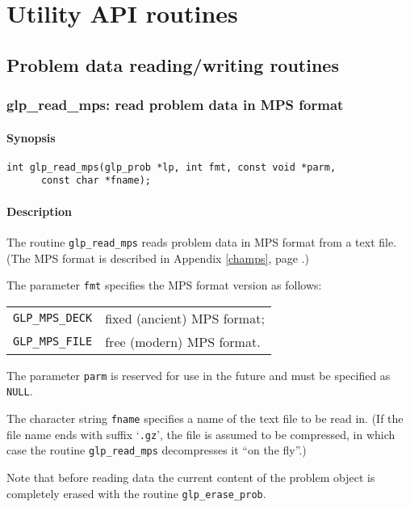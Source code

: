 
\chapter{Utility API routines}

\section{Problem data reading/writing routines}

\subsection{glp\_read\_mps: read problem data in MPS format}

\subsubsection*{Synopsis}

\begin{verbatim}
int glp_read_mps(glp_prob *lp, int fmt, const void *parm,
      const char *fname);
\end{verbatim}

\subsubsection*{Description}

The routine \verb|glp_read_mps| reads problem data in MPS format from a
text file. (The MPS format is described in Appendix \ref{champs}, page
\pageref{champs}.)

The parameter \verb|fmt| specifies the MPS format version as follows:

\begin{tabular}{@{}ll}
\verb|GLP_MPS_DECK| & fixed (ancient) MPS format; \\
\verb|GLP_MPS_FILE| & free (modern) MPS format. \\
\end{tabular}

The parameter \verb|parm| is reserved for use in the future and must be
specified as \verb|NULL|.

The character string \verb|fname| specifies a name of the text file to
be read in. (If the file name ends with suffix `\verb|.gz|', the file is
assumed to be compressed, in which case the routine \verb|glp_read_mps|
decompresses it ``on the fly''.)

Note that before reading data the current content of the problem object
is completely erased with the routine \verb|glp_erase_prob|.

